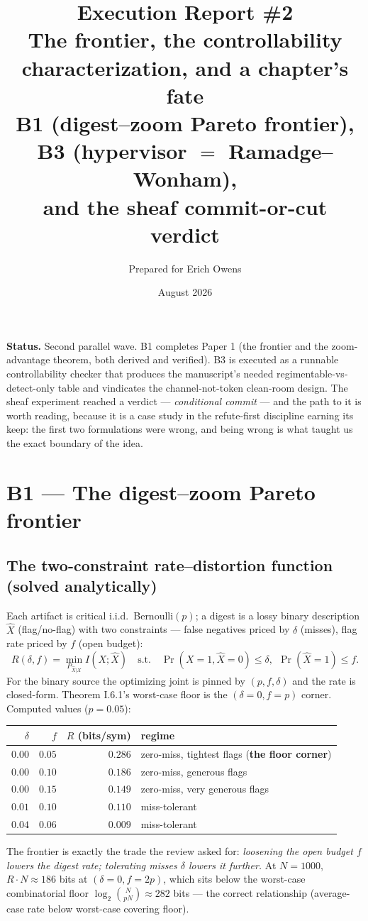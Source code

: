 \documentclass[11pt,a4paper]{article}
\title{\textbf{Execution Report \#2}\\[4pt]
\large The frontier, the controllability characterization, and a chapter's fate\\[3pt]
\normalsize B1 (digest--zoom Pareto frontier), B3 (hypervisor $=$ Ramadge--Wonham),\\ and the sheaf commit-or-cut verdict}
\author{Prepared for Erich Owens}
\date{August 2026}
\begin{document}
\maketitle

\noindent\textbf{Status.} Second parallel wave. B1 completes Paper 1 (the frontier and the zoom-advantage theorem, both derived and verified). B3 is executed as a runnable controllability checker that produces the manuscript's needed regimentable-vs-detect-only table and vindicates the channel-not-token clean-room design. The sheaf experiment reached a verdict --- \emph{conditional commit} --- and the path to it is worth reading, because it is a case study in the refute-first discipline earning its keep: the first two formulations were wrong, and being wrong is what taught us the exact boundary of the idea.

\section{B1 --- The digest--zoom Pareto frontier}
\subsection{The two-constraint rate--distortion function (solved analytically)}
Each artifact is critical i.i.d.\ Bernoulli$(p)$; a digest is a lossy binary description $\hat X$ (flag/no-flag) with two constraints --- false negatives priced by $\delta$ (misses), flag rate priced by $f$ (open budget):
\[
R(\delta,f)=\min_{P_{\hat X|X}} I(X;\hat X)\quad\text{s.t.}\quad \Pr(X{=}1,\hat X{=}0)\le\delta,\ \ \Pr(\hat X{=}1)\le f.
\]
For the binary source the optimizing joint is pinned by $(p,f,\delta)$ and the rate is closed-form. Theorem I.6.1's worst-case floor is the $(\delta{=}0,f{=}p)$ corner. Computed values ($p=0.05$):
\begin{center}
\begin{tabular}{@{}rrrl@{}}
\toprule
$\delta$ & $f$ & $R$ (bits/sym) & regime \\
\midrule
$0.00$ & $0.05$ & $0.286$ & zero-miss, tightest flags (\textbf{the floor corner}) \\
$0.00$ & $0.10$ & $0.186$ & zero-miss, generous flags \\
$0.00$ & $0.15$ & $0.149$ & zero-miss, very generous flags \\
$0.01$ & $0.10$ & $0.110$ & miss-tolerant \\
$0.04$ & $0.06$ & $0.009$ & miss-tolerant \\
\bottomrule
\end{tabular}
\end{center}
The frontier is exactly the trade the review asked for: \emph{loosening the open budget $f$ lowers the digest rate; tolerating misses $\delta$ lowers it further.} At $N{=}1000$, $R\!\cdot\!N\approx186$ bits at $(\delta{=}0,f{=}2p)$, which sits below the worst-case combinatorial floor $\log_2\binom{N}{pN}\approx282$ bits --- the correct relationship (average-case rate below worst-case covering floor).
\end{document}
